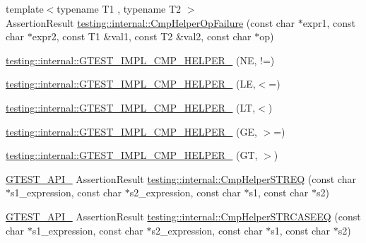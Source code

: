 \begin{DoxyCompactItemize}
\item 
{\footnotesize template$<$typename T1 , typename T2 $>$ }\\Assertion\+Result \mbox{\hyperlink{namespacetesting_1_1internal_a894ffccd936d78fd555f490020c27f0a}{testing\+::internal\+::\+Cmp\+Helper\+Op\+Failure}} (const char $\ast$expr1, const char $\ast$expr2, const T1 \&val1, const T2 \&val2, const char $\ast$op)
\item 
\mbox{\hyperlink{namespacetesting_1_1internal_aa14e3caa94126d7fb8e06bfb3d24ae4a}{testing\+::internal\+::\+G\+T\+E\+S\+T\+\_\+\+I\+M\+P\+L\+\_\+\+C\+M\+P\+\_\+\+H\+E\+L\+P\+E\+R\+\_\+}} (NE, !=)
\item 
\mbox{\hyperlink{namespacetesting_1_1internal_ade60646b18728043fff84d7b4125de2c}{testing\+::internal\+::\+G\+T\+E\+S\+T\+\_\+\+I\+M\+P\+L\+\_\+\+C\+M\+P\+\_\+\+H\+E\+L\+P\+E\+R\+\_\+}} (LE,$<$=)
\item 
\mbox{\hyperlink{namespacetesting_1_1internal_aabcbff15eac496f8487699d19f42c274}{testing\+::internal\+::\+G\+T\+E\+S\+T\+\_\+\+I\+M\+P\+L\+\_\+\+C\+M\+P\+\_\+\+H\+E\+L\+P\+E\+R\+\_\+}} (LT,$<$)
\item 
\mbox{\hyperlink{namespacetesting_1_1internal_af969886067930ce70f6405cd5aa8b06b}{testing\+::internal\+::\+G\+T\+E\+S\+T\+\_\+\+I\+M\+P\+L\+\_\+\+C\+M\+P\+\_\+\+H\+E\+L\+P\+E\+R\+\_\+}} (GE, $>$=)
\item 
\mbox{\hyperlink{namespacetesting_1_1internal_a7fdb4fc164db83c51dfad17640bfeae9}{testing\+::internal\+::\+G\+T\+E\+S\+T\+\_\+\+I\+M\+P\+L\+\_\+\+C\+M\+P\+\_\+\+H\+E\+L\+P\+E\+R\+\_\+}} (GT, $>$)
\item 
\mbox{\hyperlink{_obj__test_2lib_2googletest-release-1_88_81_2googletest_2include_2gtest_2internal_2gtest-port_8h_aa73be6f0ba4a7456180a94904ce17790}{G\+T\+E\+S\+T\+\_\+\+A\+P\+I\+\_\+}} Assertion\+Result \mbox{\hyperlink{namespacetesting_1_1internal_a711a396ed8f636ecd14a850a89d181b6}{testing\+::internal\+::\+Cmp\+Helper\+S\+T\+R\+EQ}} (const char $\ast$s1\+\_\+expression, const char $\ast$s2\+\_\+expression, const char $\ast$s1, const char $\ast$s2)
\item 
\mbox{\hyperlink{_obj__test_2lib_2googletest-release-1_88_81_2googletest_2include_2gtest_2internal_2gtest-port_8h_aa73be6f0ba4a7456180a94904ce17790}{G\+T\+E\+S\+T\+\_\+\+A\+P\+I\+\_\+}} Assertion\+Result \mbox{\hyperlink{namespacetesting_1_1internal_a30dfeb01f1bc8087c7d05205d5fa75c1}{testing\+::internal\+::\+Cmp\+Helper\+S\+T\+R\+C\+A\+S\+E\+EQ}} (const char $\ast$s1\+\_\+expression, const char $\ast$s2\+\_\+expression, const char $\ast$s1, const char $\ast$s2)

\end{DoxyCompactItemize}
